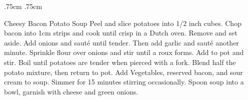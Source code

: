 \documentclass[]{article}
\title{}
\author{}
\begin{document}
\RecipeWidths{\textwidth}{3cm}{0.5cm}{5cm} {.75cm} {.75cm}
\begin{recipe}{Cheesy Bacon Potato Soup}{}{}
	Peel and slice potatoes into 1/2 inch cubes. 
	Chop bacon into 1cm strips and cook until crisp in a Dutch oven. Remove and set aside. 
	Add onions and sauté until tender. 
	Then add garlic and sauté another minute.
	Sprinkle flour over onions and stir until a roux forms. 
	Add to pot and stir. Boil until potatoes are tender when pierced with a fork. Blend half the potato mixture, then return to pot. 
	Add Vegetables, reserved bacon, and sour cream to soup. Simmer for 15 minutes stirring occasionally. 
	Spoon soup into a bowl, garnish with cheese and green onions. 
\end{recipe}
\end{document}
